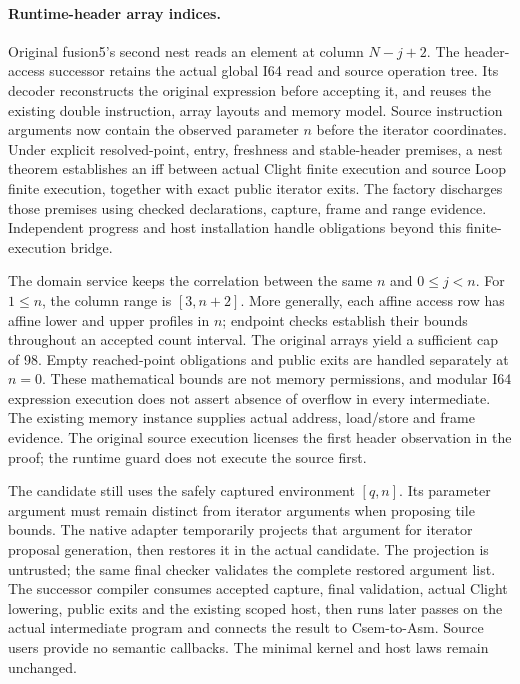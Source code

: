 \paragraph{Runtime-header array indices.}
Original fusion5's second nest reads an element at column $N-j+2$.
The header-access successor retains the actual global I64 read and source
operation tree. Its decoder reconstructs the original expression before
accepting it, and reuses the existing double instruction, array layouts and
memory model. Source instruction arguments now contain the observed parameter
$n$ before the iterator coordinates. Under explicit resolved-point, entry,
freshness and stable-header premises, a nest theorem establishes an iff between
actual Clight finite execution and source Loop finite execution, together with
exact public iterator exits. The factory discharges those premises using
checked declarations, capture, frame and range evidence. Independent progress
and host installation handle obligations beyond this finite-execution bridge.

The domain service keeps the correlation between the same $n$ and
$0\leq j<n$. For $1\leq n$, the column range is $[3,n+2]$.
More generally, each affine access row has affine lower and upper profiles in
$n$; endpoint checks establish their bounds throughout an accepted count
interval. The original arrays yield a sufficient cap of 98. Empty reached-point
obligations and public exits are handled separately at $n=0$.
These mathematical bounds are not memory permissions, and modular I64
expression execution does not assert absence of overflow in every intermediate.
The existing memory instance supplies actual address, load/store and frame
evidence. The original source execution licenses the first header observation
in the proof; the runtime guard does not execute the source first.

The candidate still uses the safely captured environment $[q,n]$.
Its parameter argument must remain distinct from iterator arguments when
proposing tile bounds. The native adapter temporarily projects that argument
for iterator proposal generation, then restores it in the actual candidate.
The projection is untrusted; the same final checker validates the complete
restored argument list. The successor compiler consumes accepted capture,
final validation, actual Clight lowering, public exits and the existing scoped
host, then runs later passes on the actual intermediate program and connects
the result to Csem-to-Asm. Source users provide no semantic callbacks. The
minimal kernel and host laws remain unchanged.

